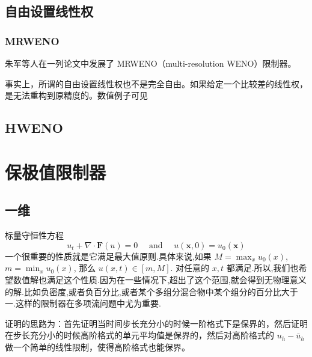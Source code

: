 \documentclass{book}
\begin{document}
\subsection{自由设置线性权}

\subsubsection{MRWENO}
朱军等人在一列论文\cite{MRWENO-1,MRWENO-2,MRWENO-3}中发展了 MRWENO（multi-resolution WENO）限制器。

事实上，所谓的自由设置线性权也不是完全自由。如果给定一个比较差的线性权，是无法重构到原精度的。数值例子可见 \cite{RN133}

\subsection{HWENO}




\section{保极值限制器}
\subsection{一维}
\cite{RN6}
标量守恒性方程
\begin{equation}
    u_{t}+\nabla \cdot \mathbf{F}(u)=0 \quad \text { and } \quad u(\mathbf{x}, 0)=u_{0}(\mathbf{x})
\end{equation}
一个很重要的性质就是它满足最大值原则.具体来说,如果 $M=\max_x u_0(x)$,$m=\min_x u_0(x)$, 那么 $u(x,t)\in[m,M]$. 对任意的 $x,t$ 都满足.所以,我们也希望数值解也满足这个性质.因为在一些情况下,超出了这个范围,就会得到无物理意义的解.比如负密度,或者负百分比,或者某个多组分混合物中某个组分的百分比大于一.这样的限制器在多项流问题中尤为重要.\cite{PP-review}

证明的思路为：首先证明当时间步长充分小的时候一阶格式下是保界的，然后证明在步长充分小的时候高阶格式的单元平均值是保界的，然后对高阶格式的 $u_h-\bar{u}_h$ 做一个简单的线性限制，使得高阶格式也能保界。
\end{document}
